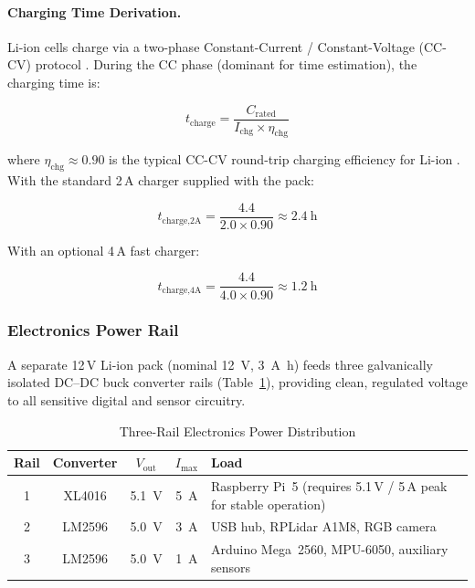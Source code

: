 \documentclass[12pt,a4paper]{report}
\begin{document}
\paragraph{Charging Time Derivation.}
Li-ion cells charge via a two-phase Constant-Current / Constant-Voltage
(CC-CV) protocol \cite{andrea2010battery, linden2011handbook}.
During the CC phase (dominant for time estimation), the
charging time is:

\begin{equation}
  t_\text{charge} = \frac{C_\text{rated}}{I_\text{chg} \times \eta_\text{chg}}
  \label{eq:charge_time_gen_impl}
\end{equation}

where $\eta_\text{chg} \approx 0.90$ is the typical CC-CV round-trip
charging efficiency for Li-ion \cite{andrea2010battery}.
With the standard 2\,A charger supplied with the pack:

\begin{equation}
  t_\text{charge,2A} = \frac{4.4}{2.0 \times 0.90}
  \approx \SI{2.4}{\hour}
  \label{eq:charge_single_impl}
\end{equation}

With an optional 4\,A fast charger:

\begin{equation}
  t_\text{charge,4A} = \frac{4.4}{4.0 \times 0.90}
  \approx \SI{1.2}{\hour}
  \label{eq:charge_fast_impl}
\end{equation}

\subsubsection{Electronics Power Rail}
\label{subsec:elec_rail_impl}

A separate 12\,V Li-ion pack (nominal \SI{12}{\volt}, \SI{3}{\ampere\hour})
feeds three galvanically isolated DC–DC buck converter rails
(Table~\ref{tab:power_rails_impl}), providing clean, regulated voltage to all
sensitive digital and sensor circuitry.

\begin{table}[H]
\centering
\caption{Three-Rail Electronics Power Distribution}
\label{tab:power_rails_impl}
\begin{tabular}{@{}c c c c p{5.5cm}@{}}
\toprule
\rowcolor{rafblue!20}
\textbf{Rail} & \textbf{Converter} & $V_\text{out}$ & $I_\text{max}$
  & \textbf{Load} \\
\midrule
1 & XL4016  & \SI{5.1}{\volt} & \SI{5}{\ampere}
  & Raspberry Pi~5 (requires 5.1\,V / 5\,A peak for stable operation) \\
2 & LM2596  & \SI{5.0}{\volt} & \SI{3}{\ampere}
  & USB hub, RPLidar A1M8, RGB camera \\
3 & LM2596  & \SI{5.0}{\volt} & \SI{1}{\ampere}
  & Arduino Mega~2560, MPU-6050, auxiliary sensors \\
\bottomrule
\end{tabular}
\end{table}
\end{document}
